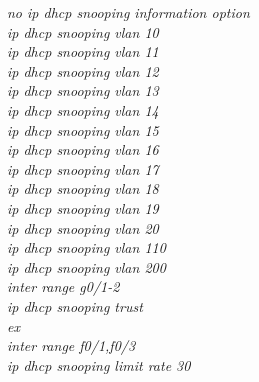 \documentclass[a4paper, 12pt]{article}
\begin{document}
\hspace*{2cm}\textit{no ip dhcp snooping information option\\
\hspace*{2cm}ip dhcp snooping vlan 10\\
\hspace*{2cm}ip dhcp snooping vlan 11\\
\hspace*{2cm}ip dhcp snooping vlan 12\\
\hspace*{2cm}ip dhcp snooping vlan 13\\
\hspace*{2cm}ip dhcp snooping vlan 14\\
\hspace*{2cm}ip dhcp snooping vlan 15\\
\hspace*{2cm}ip dhcp snooping vlan 16\\
\hspace*{2cm}ip dhcp snooping vlan 17\\
\hspace*{2cm}ip dhcp snooping vlan 18\\
\hspace*{2cm}ip dhcp snooping vlan 19\\
\hspace*{2cm}ip dhcp snooping vlan 20\\
\hspace*{2cm}ip dhcp snooping vlan 110\\
\hspace*{2cm}ip dhcp snooping vlan 200\\
\hspace*{2cm}inter range g0/1-2\\
\hspace*{2cm}ip dhcp snooping trust\\
\hspace*{2cm}ex\\
\hspace*{2cm}inter range f0/1,f0/3\\
\hspace*{2cm}ip dhcp snooping limit rate 30\\}
\end{document}
